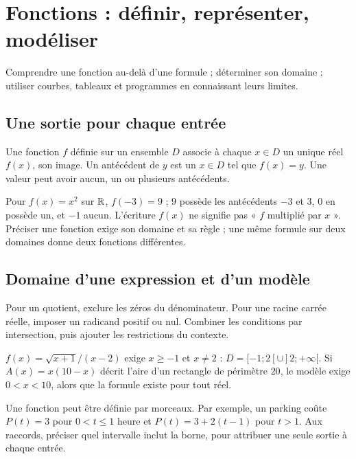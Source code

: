 \documentclass[../cours_2de.tex]{subfiles}
\begin{document}
\setcounter{chapter}{11}
\chapter{Fonctions : définir, représenter, modéliser}
\label{sec:ch12}
\begin{objectif}
Comprendre une fonction au-delà d'une formule ; déterminer son domaine ; utiliser courbes, tableaux et programmes en connaissant leurs limites.
\end{objectif}
\section{Une sortie pour chaque entrée}
\begin{definition}
Une fonction $f$ définie sur un ensemble $D$ associe à chaque $x\in D$ un unique réel $f(x)$, son image.
Un antécédent de $y$ est un $x\in D$ tel que $f(x)=y$. Une valeur peut avoir aucun, un ou plusieurs antécédents.
\end{definition}
Pour $f(x)=x^2$ sur $\mathbb{R}$, $f(-3)=9$ ; $9$ possède les antécédents $-3$ et $3$, $0$ en possède un, et $-1$ aucun.
L'écriture $f(x)$ ne signifie pas « $f$ multiplié par $x$ ».
Préciser une fonction exige son domaine et sa règle ; une même formule sur deux domaines donne deux fonctions différentes.
\section{Domaine d'une expression et d'un modèle}
\begin{methode}
Pour un quotient, exclure les zéros du dénominateur.
Pour une racine carrée réelle, imposer un radicand positif ou nul.
Combiner les conditions par intersection, puis ajouter les restrictions du contexte.
\end{methode}
\begin{exemple}
$f(x)=\sqrt{x+1}/(x-2)$ exige $x\geq-1$ et $x\ne2$ :
$D=[-1;2[\cup]2;+\infty[$.
Si $A(x)=x(10-x)$ décrit l'aire d'un rectangle de périmètre $20$, le modèle exige $0<x<10$, alors que la formule existe pour tout réel.
\end{exemple}
Une fonction peut être définie par morceaux. Par exemple, un parking coûte
$P(t)=3$ pour $0<t\leq1$ heure et $P(t)=3+2(t-1)$ pour $t>1$.
Aux raccords, préciser quel intervalle inclut la borne, pour attribuer une seule sortie à chaque entrée.
\end{document}
